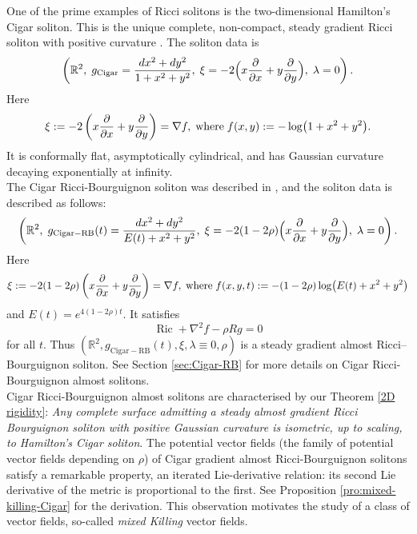 \documentclass{article}
\theoremstyle{definition}
\theoremstyle{remark}
\begin{document}
One of the prime examples of  Ricci solitons is the two-dimensional Hamilton's Cigar soliton.  
This is the unique complete, non-compact, steady gradient Ricci soliton 
with positive curvature \cite{Hamilton1988}.  The soliton data is   
\[
\left(\mathbb{R}^2,\;
g_{\mathrm{Cigar}} =\frac{dx^2+dy^2}{1+x^2+y^2},\;
  \xi=-2\Bigl(x\frac{\partial}{\partial x}
             +y\frac{\partial}{\partial y}\Bigr),\;
  \lambda=0\right).
\]
Here
\begin{equation}
  \xi := -2 \left(x\frac{\partial}{\partial x}
                     +y\frac{\partial}{\partial y}\right) = \nabla f, \\  \nonumber \;
 \mbox{where} \;  f(x,y) :=  - \log\bigl(1+x^2+y^2\bigr).                        
\end{equation}
It is conformally flat, asymptotically cylindrical, and has Gaussian curvature decaying exponentially at infinity. \\
The Cigar Ricci-Bourguignon  soliton was described in 
\cite{aqib2025characterizations}, and the soliton data is described as follows:
\[
\left(\mathbb{R}^2,\;
g_{\mathrm{Cigar-RB}}(t) =\frac{dx^2+dy^2}{E(t)+x^2+y^2},\;
  \xi=-2 (1-2 \rho) \Bigl(x\frac{\partial}{\partial x}
             +y\frac{\partial}{\partial y}\Bigr),\;
  \lambda=0\right).
\]
Here
\begin{equation}\label{xi-Cigar}
  \xi := -2 (1-2\rho) \left(x\frac{\partial}{\partial x}
                     +y\frac{\partial}{\partial y}\right) = \nabla f, \\  \nonumber \;
 \mbox{where} \;  f(x,y, t) :=  - (1-2 \rho)\log\bigl(E(t)+x^2+y^2\bigr)                
\end{equation}
and $E(t)=e^{4(1-2\rho)t}$.
It satisfies
\[
\operatorname{Ric} + \nabla^2 f - \rho R g = 0
\]
for all $t$. Thus $(\mathbb{R}^2, g_{\mathrm{Cigar-RB}}(t),\xi,\lambda\equiv0,\rho)$ is a steady 
gradient almost Ricci--Bourguignon soliton. 
See Section \ref{sec:Cigar-RB}  for more details on Cigar 
Ricci-Bourguignon almost solitons.\\

 Cigar Ricci-Bourguignon almost solitons are characterised by our Theorem  \ref{2D rigidity}: {\it Any complete surface 
admitting a steady almost gradient Ricci Bourguignon soliton with positive Gaussian curvature
 is isometric, up to scaling, to Hamilton's Cigar soliton}. The potential vector fields (the family of potential vector fields 
 depending on $\rho$) of Cigar gradient almost Ricci-Bourguignon solitons satisfy a remarkable property, an iterated Lie-derivative relation: its second Lie derivative of the metric is proportional to the first. See Proposition \ref{pro:mixed-killing-Cigar} for the derivation. This observation motivates the study of 
a class of vector fields, so-called \emph{mixed Killing} vector fields.\\
\end{document}

